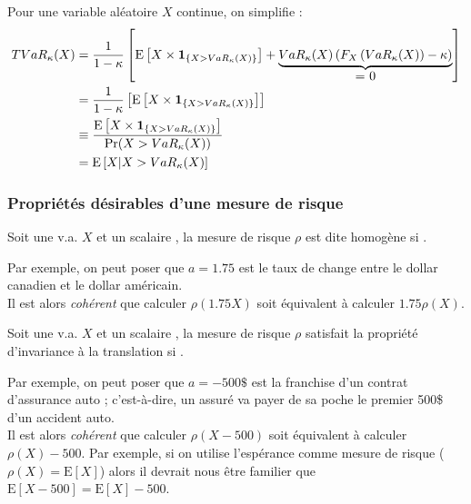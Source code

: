 \documentclass[10pt, french]{article}
\begin{document}
\begin{multicols*}{2}
Pour une variable aléatoire $X$ continue, on simplifie :
\begin{align*}
	TVaR_{\kappa}(X)
	&=	\frac{1}{1 - \kappa}\left[	\text{E}\left[X \times \bm{1}_{\{X	>	VaR_{\kappa}(X)\}}\right] + \underbrace{VaR_{\kappa}(X) \left(F_{X}\left(VaR_{\kappa}(X)\right)	-	\kappa\right)}_{\shortstack{= 0}}	\right]	\\
	&=	\frac{1}{1 - \kappa}\left[	\text{E}\left[X \times \bm{1}_{\{X	>	VaR_{\kappa}(X)\}}\right]	\right]	\\
	&\equiv	\frac{\text{E}\left[X \times \bm{1}_{\{X	>	VaR_{\kappa}(X)\}}\right]}{\Pr(X	>	VaR_{\kappa}(X))}	\\
	&=	\esp{X | X	>	VaR_{\kappa}(X)}
\end{align*}

\subsubsection{Propriétés désirables d'une mesure de risque}
\begin{definitionNOHFILLsub}[Homogénéité]
Soit une v.a. $X$ et un scalaire , la mesure de risque $\rho$ est dite homogène si .

\begin{rappel_enhanced}[Interprétation]
Par exemple, on peut poser que $a	=	1.75$ est le taux de change entre le dollar canadien et le dollar américain.\\
Il est alors \textit{cohérent} que calculer $\rho(1.75X)$ soit équivalent à calculer $1.75\rho(X)$.
\end{rappel_enhanced}
\end{definitionNOHFILLsub}

\begin{definitionNOHFILLsub}
Soit une v.a. $X$ et un scalaire , la mesure de risque $\rho$ satisfait la propriété d'invariance à la translation si .	\\

\begin{rappel_enhanced}[Interprétation]
Par exemple, on peut poser que $a	=	-500\$$ est la franchise d'un contrat d'assurance auto ; c'est-à-dire, un assuré va payer de sa poche le premier 500\$ d'un accident auto.\\

Il est alors \textit{cohérent} que calculer $\rho(X - 500)$ soit équivalent à calculer $\rho(X) - 500$. Par exemple, si on utilise l'espérance comme mesure de risque ($\rho(X)	=	\text{E}[X]$) alors  il devrait nous être familier que $\text{E}[X	-	500]	=	\text{E}[X]	-	500$.
\end{rappel_enhanced}
\end{definitionNOHFILLsub}


\end{multicols*}
\end{document}

